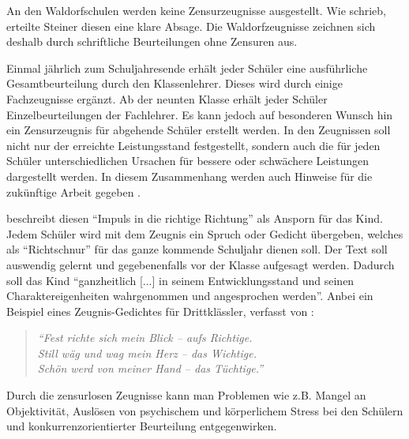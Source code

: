 An den Waldorfschulen werden keine Zensurzeugnisse ausgestellt. Wie \cite{geuenich09} schrieb, erteilte Steiner diesen eine klare Absage. Die Waldorfzeugnisse zeichnen sich deshalb durch schriftliche Beurteilungen ohne Zensuren aus. 

Einmal jährlich zum Schuljahresende erhält jeder Schüler eine ausführliche Gesamtbeurteilung durch den Klassenlehrer. Dieses wird durch einige Fachzeugnisse ergänzt. Ab der neunten Klasse erhält jeder Schüler Einzelbeurteilungen der Fachlehrer. Es kann jedoch auf besonderen Wunsch hin ein Zensurzeugnis für abgehende Schüler erstellt werden. In den Zeugnissen soll nicht nur der erreichte Leistungsstand festgestellt, sondern auch die für jeden Schüler unterschiedlichen Ursachen für bessere oder schwächere Leistungen dargestellt werden. In diesem Zusammenhang werden auch Hinweise für die zukünftige Arbeit gegeben \citep[vgl.][S. 51]{kiersch07}.


 \citet[S. 102]{geuenich09} beschreibt diesen \enquote{Impuls in die richtige Richtung} als Ansporn für das Kind. Jedem Schüler wird mit dem Zeugnis ein Spruch oder Gedicht übergeben, welches als \enquote{Richtschnur} für das ganze kommende Schuljahr dienen soll. Der Text soll auswendig gelernt und gegebenenfalls vor der Klasse aufgesagt werden. Dadurch soll das Kind \enquote{ganzheitlich [...] in seinem Entwicklungsstand und seinen Charaktereigenheiten wahrgenommen und angesprochen werden}. Anbei ein Beispiel eines Zeugnis-Gedichtes für Drittklässler, verfasst von \cite{kullak13}:

 \begin{quotation}
			\emph{\enquote{Fest richte sich mein Blick – aufs Richtige.\\
							Still wäg und wag mein Herz – das Wichtige.\\
							Schön werd von meiner Hand – das Tüchtige.}}
\end{quotation}

Durch die zensurlosen Zeugnisse kann man Problemen wie z.B. Mangel an Objektivität, Auslösen von psychischem und körperlichem Stress bei den Schülern und konkurrenzorientierter Beurteilung entgegenwirken. 



 








